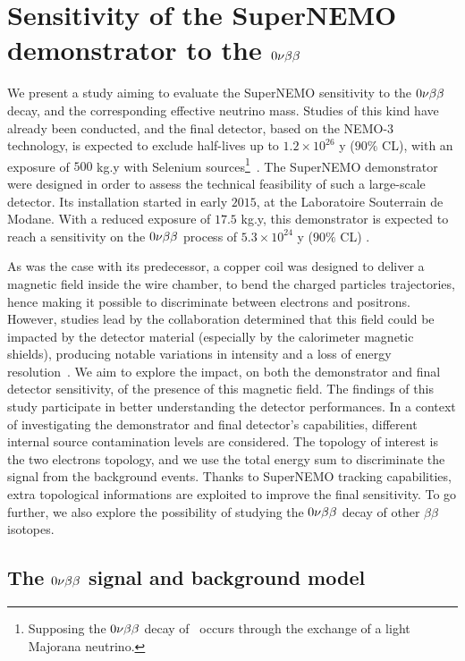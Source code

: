 \chapter{Sensitivity of the SuperNEMO demonstrator to the $0\nu\beta\beta$}
\label{ch:sensitivity}

We present a study aiming to evaluate the SuperNEMO sensitivity to the $0\nu\beta\beta$ decay, and the corresponding effective neutrino mass.
Studies of this kind have already been conducted, and the final detector, based on the NEMO-$3$ technology, is expected to exclude half-lives up to $1.2\times 10^{26}$ y ($90\%$ CL), with an exposure of $500$ kg.y with Selenium sources\footnote{Supposing the $0\nu\beta\beta$ decay of \Se\ occurs through the exchange of a light Majorana neutrino.}~\cite{art:SuperNEMO2010}.
The SuperNEMO demonstrator were designed in order to assess the technical feasibility of such a large-scale detector.
Its installation started in early $2015$, at the Laboratoire Souterrain de Modane.
With a reduced exposure of $17.5$ kg.y, this demonstrator is expected to reach a sensitivity on the $0\nu\beta\beta$ process of $5.3\times 10^{24}$ y ($90\%$ CL) \cite{CalvezThesis}.

As was the case with its predecessor, a copper coil was designed to deliver a magnetic field inside the wire chamber, to bend the charged particles trajectories, hence making it possible to discriminate between electrons and positrons.
However, studies lead by the collaboration determined that this field could be impacted by the detector material (especially by the calorimeter magnetic shields), producing notable variations in intensity and a loss of energy resolution~\cite{CalvezThesis}\cite{internal:magnetic_field}.
We aim to explore the impact, on both the demonstrator and final detector sensitivity, of the presence of this magnetic field.
The findings of this study participate in better understanding the detector performances.
In a context of investigating the demonstrator and final detector's capabilities, different internal source contamination levels are considered.
The topology of interest is the two electrons topology, and we use the total energy sum to discriminate the signal from the background events.
Thanks to SuperNEMO tracking capabilities, extra topological informations are exploited to improve the final sensitivity.
To go further, we also explore the possibility of studying the $0\nu\beta\beta$ decay of other $\beta\beta$ isotopes.

\section{The $0\nu\beta\beta$ signal and background model}
\label{sec:sensitivity_simus}

